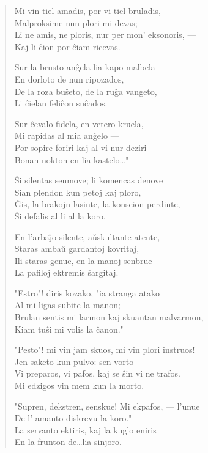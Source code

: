 \begin{verse}
                  Mi vin tiel amadis, por vi tiel bruladis, ---\\
                  Malproksime nun plori mi devas;\\
                  Li ne amis, ne ploris, nur per mon' eksonoris, ---\\
                  Kaj li \^cion por \^ciam ricevas.

                  Sur la brusto an\^gela lia kapo malbela\\
                  En dorloto de nun ripozados,\\
                  De la roza bu\^seto, de la ru\^ga vangeto,\\
                  Li \^cielan feli\^con su\^cados.

                  Sur \^cevalo fidela, en vetero kruela,\\
                  Mi rapidas al mia an\^gelo ---\\
                  Por sopire foriri kaj al vi nur deziri\\
                  Bonan nokton en lia kastelo\dots"

                  \^Si silentas senmove; li komencas denove\\
                  Sian plendon kun petoj kaj ploro,\\
                  \^Gis, la brakojn lasinte, la konscion perdinte,\\
                  \^Si defalis al li al la koro.

                  En l'arba\^{\j}o silente, a\u uskultante atente,\\
                  Staras amba\u u gardantoj kovritaj,\\
                  Ili staras genue, en la manoj senbrue\\
                  La pafiloj ektremis \^sargitaj.

                  "Estro"! diris kozako, "ia stranga atako\\
                  Al mi ligas subite la manon;\\
                  Brulan sentis mi larmon kaj skuantan malvarmon,\\
                  Kiam tu\^si mi volis la \^canon."

                  "Pesto"! mi vin jam skuos, mi vin plori
                  instruos!\\
                  Jen saketo kun pulvo: sen vorto\\
                  Vi preparos, vi pafos, kaj se \^sin vi ne
                  trafos.\\
                  Mi edzigos vin mem kun la morto.

                  "Supren, dekstren, senskue! Mi ekpafos, ---
                  l'unue\\
                  De l' amanto diskrevu la koro."\\
                  La servanto ektiris, kaj la kuglo eniris\\
                  En la frunton de\dots lia sinjoro.

\end{verse}

\smallrule{}

